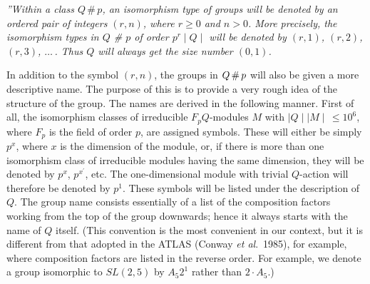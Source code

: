 {\sl ''Within a class $Q\,\#\,p$, an  isomorphism type of groups will be
denoted by an ordered pair of integers $(r,n)$, where $r \geq 0$ and $n >
0$. More precisely, the isomorphism  types in $Q$  \#  $p$ of order  $p^r
\!\! \mid \!\! Q \!\! \mid$ will be denoted by $(r,1)$, $(r,2)$, $(r,3)$,
$\ldots\,$. Thus $Q$ will always get the size number $(0,1)$.

In  addition to the symbol $(r,n)$,  the groups in $Q  \,  {\sl \#} \, p$
will  also be given a  more descriptive name.  The purpose of  this is to
provide a very rough idea of  the structure of  the group.  The names are
derived in the following manner. First of all, the isomorphism classes of
irreducible  $F_pQ$-modules $M$ with $\mid \!\!  Q  \!\! \mid \mid \!\! M
\!\! \mid \,  \leq 10^6$,  where $F_p$ is   the field of  order $p$,  are
assigned symbols. These  will either  be simply $p^x$,  where $x$  is the
dimension of the module, or, if there is more  than one isomorphism class
of irreducible modules having the same dimension, they will be denoted by
$p^x$, $p^{x^\prime}$,  etc.   The one-dimensional  module   with trivial
$Q$-action  will therefore be denoted  by  $p^1$. These  symbols will  be
listed under the description of $Q$.  The group name consists essentially
of a list  of the composition factors  working from the  top of the group
downwards; hence  it always  starts with the  name  of $Q$ itself.  (This
convention is the most  convenient in our  context,  but it is  different
from that adopted  in the ATLAS (Conway  {\it et al}.~1985), for example,
where composition factors  are listed in the  reverse order. For example,
we denote a  group isomorphic to $SL(2,5)$  by  $A_5 2^1$ rather  than $2
\cdot A_5$.)

}
